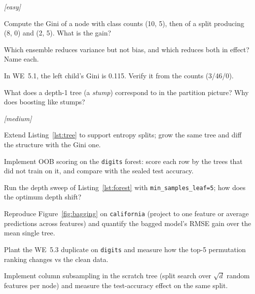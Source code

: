 \emph{[easy]}
\begin{exercise}
Compute the Gini of a node with class counts (10, 5), then of a split
producing (8, 0) and (2, 5). What is the gain?
\end{exercise}
\begin{exercise}
Which ensemble reduces variance but not bias, and which reduces both in
effect? Name each.
\end{exercise}
\begin{exercise}
In WE~5.1, the left child's Gini is 0.115. Verify it from the counts
(3/46/0).
\end{exercise}
\begin{exercise}
What does a depth-1 tree (a \emph{stump}) correspond to in the
partition picture? Why does boosting like stumps?
\end{exercise}

\emph{[medium]}
\begin{exercise}
Extend Listing~\ref{lst:tree} to support entropy splits; grow the same
tree and diff the structure with the Gini one.
\end{exercise}
\begin{exercise}
Implement OOB scoring on the \texttt{digits} forest: score each row by
the trees that did not train on it, and compare with the sealed test
accuracy.
\end{exercise}
\begin{exercise}
Run the depth sweep of Listing~\ref{lst:forest} with
\texttt{min\_samples\_leaf=5}; how does the optimum depth shift?
\end{exercise}
\begin{exercise}
Reproduce Figure~\ref{fig:bagging} on \texttt{california} (project to
one feature or average predictions across features) and quantify the
bagged model's RMSE gain over the mean single tree.
\end{exercise}
\begin{exercise}
Plant the WE~5.3 duplicate on \texttt{digits} and measure how the top-5
permutation ranking changes vs the clean data.
\end{exercise}
\begin{exercise}
Implement column subsampling in the scratch tree (split search over
$\sqrt{d}$ random features per node) and measure the test-accuracy
effect on the same split.
\end{exercise}

